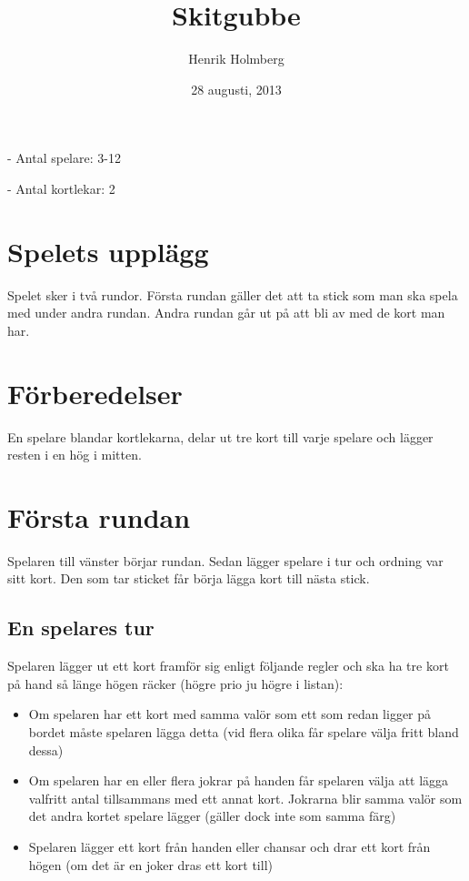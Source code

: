 \documentclass[a4paper,12pt]{article}
\title{Skitgubbe}
\date{28 augusti, 2013}
\author{Henrik Holmberg}
\begin{document}
\maketitle

- Antal spelare: 3-12

- Antal kortlekar: 2

\section{Spelets upplägg}
Spelet sker i två rundor.
Första rundan gäller det att ta stick som man ska spela med under andra rundan.
Andra rundan går ut på att bli av med de kort man har.

\section{Förberedelser}
En spelare blandar kortlekarna, delar ut tre kort till varje spelare och lägger resten i en hög i mitten.

\section{Första rundan}
Spelaren till vänster börjar rundan. Sedan lägger spelare i tur och ordning var sitt kort. Den som tar sticket får börja lägga kort till nästa stick.

\subsection{En spelares tur}
Spelaren lägger ut ett kort framför sig enligt följande regler och ska ha tre kort på hand så länge högen räcker (högre prio ju högre i listan):
\begin{itemize}
  \item Om spelaren har ett kort med samma valör som ett som redan ligger på bordet måste spelaren lägga detta (vid flera olika får spelare välja fritt bland dessa)
  \item Om spelaren har en eller flera jokrar på handen får spelaren välja att lägga valfritt antal tillsammans med ett annat kort. Jokrarna blir samma valör som det andra kortet spelare lägger (gäller dock inte som samma färg)
  \item Spelaren lägger ett kort från handen eller chansar och drar ett kort från högen (om det är en joker dras ett kort till)
\end{itemize}
\end{document}
